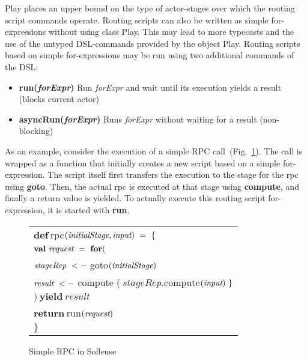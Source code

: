 \documentclass{sig-alternate}
\begin{document}
Play places an upper bound on the type of actor-stages over which the routing script commands operate. 
Routing scripts can also be written as simple for-expressions without using class Play.  This may
lead to more typecasts and the use of the untyped DSL-commands provided by the object Play.
Routing scripts based on simple for-expressions may be run using two additional commands of the DSL:

\begin{itemize}
    \item \textbf{run(\emph{forExpr})} Run \emph{forExpr} and wait until its execution yields a result (blocks current actor)
	\item \textbf{asyncRun(\emph{forExpr})} Runs \emph{forExpr} without waiting for a result (non-blocking)
\end{itemize}	

As an example, consider the execution of a simple RPC call~(Fig.~\ref{fig:rpc}).  The call is wrapped
as a function that initially creates a new script based on a simple for-expression. The script
itself first transfers the execution to the stage for the rpc using \textbf{goto}. Then, the actual 
rpc is executed at that stage using \textbf{compute}, and finally a return value is yielded.  
To actually execute this routing script for-expression, it is started with \textbf{run}.

\begin{figure}
\centering    
\begin{tabular}{l}           
$\textbf{def}\ $rpc$(\emph{initialStage}, \emph{input})\ =\ \{$\\	
\hspace{2ex} $\textbf{val}\ \emph{request}\ =\ \textbf{for} ($\\
\hspace{6ex} $\emph{stageRep}\ <-\ $goto$(\emph{initialStage})$\\
\hspace{6ex} $\emph{result}\ <-\ $compute$\ \{\ stageRep.$compute$(\emph{input})\ \}$\\
\hspace{2ex} $)\ \textbf{yield}\ result$\\
\hspace{2ex} $\textbf{return}\ $run$(\emph{request})$\\   
$\}$\\
\end{tabular}
\caption{Simple RPC in Sofleuse\label{fig:rpc}}
\end{figure}
           
\end{document}
